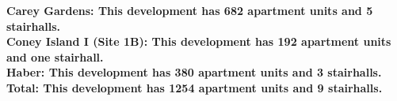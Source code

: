 \bf{Carey Gardens}: This development has 682 apartment units and 5 stairhalls.\\\bf{Coney Island I (Site 1B)}: This development has 192 apartment units and one stairhall.\\\bf{Haber}: This development has 380 apartment units and 3 stairhalls.\\\bf{Total}: This development has 1254 apartment units and 9 stairhalls.\\